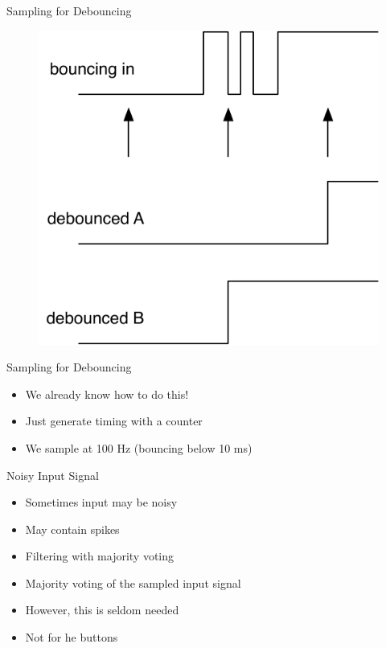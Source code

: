 \begin{frame}[fragile]{Sampling for Debouncing}
\begin{figure}
  \includegraphics[scale=\scale]{../figures/debounce}
\end{figure}
\end{frame}


\begin{frame}[fragile]{Sampling for Debouncing}
\begin{itemize}
\item We already know how to do this!
\item Just generate timing with a counter
\item We sample at 100 Hz (bouncing below 10 ms)
\end{itemize}
\end{frame}


\begin{frame}[fragile]{Noisy Input Signal}
\begin{itemize}
\item Sometimes input may be noisy
\item May contain spikes
\item Filtering with majority voting
\item Majority voting of the sampled input signal
\item However, this is seldom needed
\item Not for he buttons
\end{itemize}
\end{frame}


